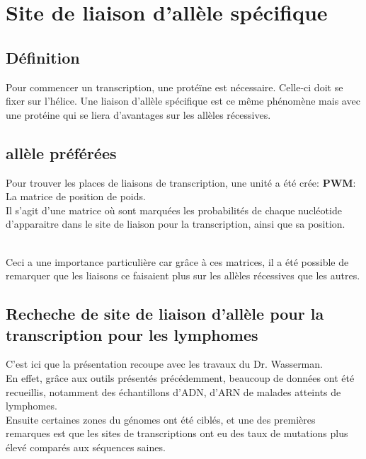 \section{Site de liaison d'allèle spécifique}

\subsection{Définition}
Pour commencer un transcription, une protéïne est nécessaire. Celle-ci doit se fixer sur l'hélice. Une liaison d'allèle spécifique est ce même phénomène mais avec une protéine qui se liera d'avantages sur les allèles récessives.

\subsection{allèle préférées}

Pour trouver les places de liaisons de transcription, une unité a été crée: \textbf{PWM}: La matrice de position de poids.\\
Il s'agit d'une matrice où sont marquées les probabilités de chaque nucléotide d'apparaitre dans le site de liaison pour la transcription, ainsi que sa position.

\\
Ceci a une importance particulière car grâce à ces matrices, il a été possible de remarquer que les liaisons ce faisaient plus sur les allèles récessives que les autres.

\subsection{Recheche de site de liaison d'allèle pour la transcription pour les lymphomes}

C'est ici que la présentation recoupe avec les travaux du Dr. Wasserman.\\
\newline
En effet, grâce aux outils présentés précédemment, beaucoup de données ont été recueillis, notamment des échantillons d'ADN, d'ARN de malades atteints de lymphomes.
\\
Ensuite certaines zones du génomes ont été ciblés, et une des premières remarques est que les sites de transcriptions ont eu des taux de mutations plus élevé comparés aux séquences saines.
\\

